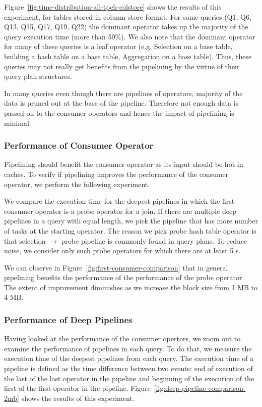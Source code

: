 Figure~\ref{fig:time-distribution-all-tpch-colstore} shows the results of this experiment, for tables stored in column store format. 
For some queries (Q1, Q6, Q13, Q15, Q17, Q19, Q22) the dominant operator takes up the majority of the query execution time (more than 50\%).
We also note that the dominant operator for many of these queries is a leaf operator (e.g. Selection on a base table, building a hash table on a base table, Aggregation on a base table). 
Thus, these queries may not really get benefits from the pipelining by the virtue of their query plan structures.

In many queries even though there are pipelines of operators, majority of the data is pruned out at the base of the pipeline. 
Therefore not enough data is passed on to the consumer operators and hence the impact of pipelining is minimal. 

\subsubsection{Performance of Consumer Operator}
Pipelining should benefit the consumer operator as its input should be hot in caches.
To verify if pipelining improves the performance of the consumer operator, we perform the following experiment.

We compare the \wo{} execution time for the deepest pipelines in which the first consumer operator is a probe operator for a join.
If there are multiple deep pipelines in a query with equal length, we pick the pipeline that has more number of tasks at the starting operator. 
The reason we pick probe hash table operator is that selection $\rightarrow$ probe pipeline is commonly found in query plans.
To reduce noise, we consider only such probe operators for which there are at least 5 \wo{}s.

We can observe in Figure~\ref{fig:first-consumer-comparison} that in general pipelining benefits the performance of the performance of the probe operator. 
The extent of improvement diminishes as we increase the block size from 1 MB to 4 MB.

\subsubsection{Performance of Deep Pipelines}
Having looked at the performance of the consumer opertors, we zoom out to examine the performance of pipelines in each query.
To do that, we measure the execution time of the deepest pipelines from each query.
The execution time of a pipeline is defined as the time difference between two events: end of execution of the last \wo{} of the last operator in the pipeline and beginning of the execution of the first \wo{} of the first operator in the pipeline. 
Figure~\ref{fig:deep-pipeline-comparison-2mb} shows the results of this experiment. 


